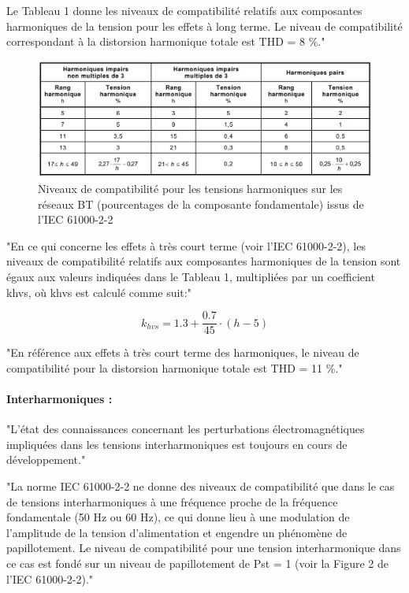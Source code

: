 Le Tableau 1 donne les niveaux de compatibilité relatifs aux composantes harmoniques de la tension pour les effets à long terme. Le niveau de compatibilité correspondant à la distorsion harmonique totale est THD = 8 \%."

\begin{figure}[H]
    \begin{center}
        \includegraphics[width=\textwidth]{assets/figures/IECTR61000_tab1.png}
    \end{center}
    \caption{Niveaux de compatibilité pour les tensions harmoniques sur les réseaux BT (pourcentages de la composante fondamentale) issus de l'IEC 61000-2-2}
    \label{IECTR61000_tab1}
\end{figure}

"En ce qui concerne les effets à très court terme (voir l'IEC 61000-2-2), les niveaux de compatibilité relatifs aux composantes harmoniques de la tension sont égaux aux valeurs indiquées dans le Tableau 1, multipliées par un coefficient khvs, où khvs est calculé comme suit:"

\begin{equation}
    k_{hvs} = 1.3 + \frac{0.7}{45} \cdot (h-5)
\end{equation}

"En référence aux effets à très court terme des harmoniques, le niveau de compatibilité pour la distorsion harmonique totale est THD = 11 \%."



\paragraph{Interharmoniques :}

"L'état des connaissances concernant les perturbations électromagnétiques impliquées dans les tensions interharmoniques est toujours en cours de développement."

"La norme IEC 61000-2-2 ne donne des niveaux de compatibilité que dans le cas de tensions interharmoniques à une fréquence proche de la fréquence fondamentale (50 Hz ou 60 Hz), ce qui donne lieu à une modulation de l'amplitude de la tension d'alimentation et engendre un phénomène de papillotement. Le niveau de compatibilité pour une tension interharmonique dans ce cas est fondé sur un niveau de papillotement de Pst = 1 (voir la Figure 2 de l'IEC 61000-2-2)."


